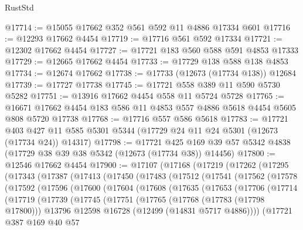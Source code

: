 \begin{lexlean}{RustStd}
\begin{coremodule}
{\begin{coremodule}
{{{{{{{{{{{{{{{{{{{{{{{{{{{{{{{{{{{{{{{{{{{{{{{{{{{{{{{{{{{{{{{{{{{{{{{{{{{{{{{{@17714 := @15055 @17662 @352 @561 @592 @11 @4886 @17334 @601
@17716 := @12293 @17662 @4454
@17719 := @17716 @561 @592 @17334
@17721 := @12302 @17662 @4454
@17727 := @17721 @183 @560 @588 @591 @4853 @17333
@17729 := @12665 @17662 @4454
@17733 := @17729 @138 @588 @138 @4853
@17734 := @12674 @17662
@17738 := @17733 (@12673 (@17734 @138)) @12684
@17739 := @17727 @17738
@17745 := @17721 @558 @389 @11 @590 @5730 @5282
@17751 := @13916 @17662 @4454 @558 @11 @5724 @5728
@17765 := @16671 @17662 @4454 @183 @586 @11 @4853 @557 @4886 @5618 @4454 @5605 @808 @5720 @17738
@17768 := @17716 @557 @586 @5618
@17783 := @17721
    @403
    @427
    @11
    @585
    @5301
    @5344
    (@17729 @24 @11 @24 @5301 (@12673 (@17734 @24)) @14317)
@17798 := @17721
    @425
    @169
    @39
    @57
    @5342
    @4838
    (@17729 @38 @39 @38 @5342 (@12673 (@17734 @38)) @14456)
@17800 := @12546 @17662 @4454
@17900 := @17107
    (@17168
      (@17219
        (@17262
          (@17295
            (@17343
              (@17387
                (@17413
                  (@17450
                    (@17483
                      (@17512
                        (@17541
                          (@17562
                            (@17578
                              (@17592
                                (@17596
                                  (@17600
                                    (@17604
                                      (@17608
                                        (@17635
                                          (@17653
                                            (@17706
                                              (@17714
                                                (@17719
                                                  (@17739
                                                    (@17745
                                                      (@17751
                                                        (@17765
                                                          (@17768 (@17783 (@17798 @17800)))
                                                          @13796
                                                          @12598
                                                          @16728
                                                          (@12499 (@14831 @5717 @4886))))
                                                      (@17721
                                                        @387
                                                        @169
                                                        @40
                                                        @57
}}}}}}}}}}}}}}}}}}}}}}}}}}}}}}}}}}}}}}}}}}}}}}}}}}}}}}}}}}}}}}}}}}}}}}}}}}}}}}}}
\end{coremodule}}
\end{coremodule}
\end{lexlean}
